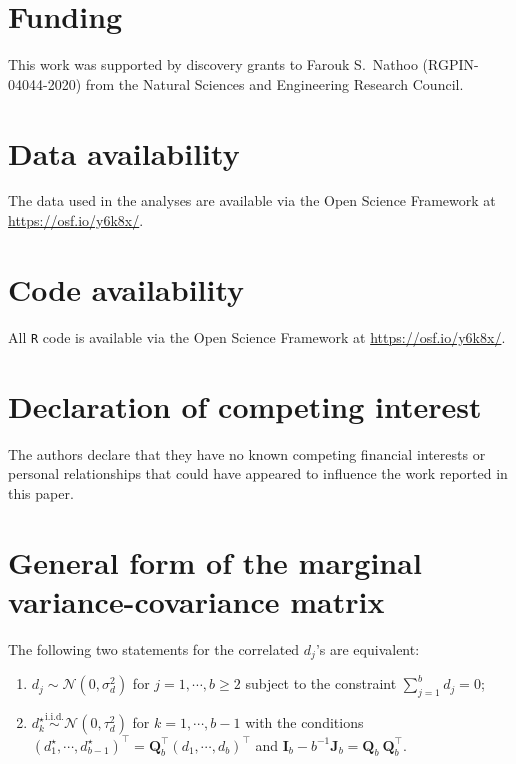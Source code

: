 \documentclass[preprint,12pt,authoryear]{elsarticle}
\begin{document}
\section*{Funding }

This work was supported by discovery grants to Farouk S.~Nathoo (RGPIN-04044-2020) from the Natural Sciences and Engineering Research Council.

\section*{Data availability}

The data used in the analyses are available via the Open Science Framework at \url{https://osf.io/y6k8x/}.

\section*{Code availability}

All \texttt{R} code is available via the Open Science Framework at \url{https://osf.io/y6k8x/}.

\section*{Declaration of competing interest}

The authors declare that they have no known competing financial interests or personal relationships that could have appeared to influence the work reported in this paper.


\clearpage

\appendix
\section{General form of the marginal variance-covariance matrix}
\label{app1}

The following two statements for the correlated $d_j$'s are equivalent:
\begin{enumerate}
	\item $d_j\sim\mathcal{N}(0,\sigma_d^2)$ for $j=1,\dotsb,b\geqslant2$ subject to the constraint $\textstyle\sum_{j=1}^b d_j=0$;
	\item $d_k^\star\overset{\mathrm{i.i.d.}}{\sim}\mathcal{N}(0,\tau_d^2)$ for $k=1,\dotsb,b-1$ with the conditions $(d_1^\star,\dotsb,d_{b-1}^\star)^\top=\mathbf{Q}_b^\top(d_1,\dotsb,d_{b})^\top$ and $\mathbf{I}_b-b^{-1}\mathbf{J}_b=\mathbf{Q}_b\ \!\mathbf{Q}_b^\top$.
\end{enumerate}
\end{document}
